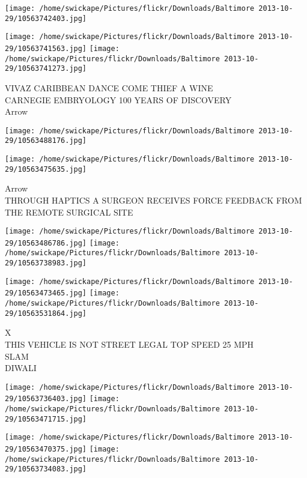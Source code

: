 \documentclass[10pt,letterpaper]{article}
\begin{document}
\texttt{[image: /home/swickape/Pictures/flickr/Downloads/Baltimore 2013-10-29/10563742403.jpg]}

\vspace{0.25in}
\texttt{[image: /home/swickape/Pictures/flickr/Downloads/Baltimore 2013-10-29/10563741563.jpg]}
\texttt{[image: /home/swickape/Pictures/flickr/Downloads/Baltimore 2013-10-29/10563741273.jpg]}

VIVAZ CARIBBEAN DANCE COME THIEF A WINE\\
CARNEGIE EMBRYOLOGY 100 YEARS OF DISCOVERY\\
Arrow\\
\pagebreak

\texttt{[image: /home/swickape/Pictures/flickr/Downloads/Baltimore 2013-10-29/10563488176.jpg]}

\vspace{0.25in}
\texttt{[image: /home/swickape/Pictures/flickr/Downloads/Baltimore 2013-10-29/10563475635.jpg]}

Arrow\\
THROUGH HAPTICS A SURGEON RECEIVES FORCE FEEDBACK FROM THE REMOTE SURGICAL SITE\\
\pagebreak

\texttt{[image: /home/swickape/Pictures/flickr/Downloads/Baltimore 2013-10-29/10563486786.jpg]}
\texttt{[image: /home/swickape/Pictures/flickr/Downloads/Baltimore 2013-10-29/10563738983.jpg]}

\texttt{[image: /home/swickape/Pictures/flickr/Downloads/Baltimore 2013-10-29/10563473465.jpg]}
\texttt{[image: /home/swickape/Pictures/flickr/Downloads/Baltimore 2013-10-29/10563531864.jpg]}

X\\
THIS VEHICLE IS NOT STREET LEGAL TOP SPEED 25 MPH\\
SLAM\\
DIWALI\\
\pagebreak

\texttt{[image: /home/swickape/Pictures/flickr/Downloads/Baltimore 2013-10-29/10563736403.jpg]}
\texttt{[image: /home/swickape/Pictures/flickr/Downloads/Baltimore 2013-10-29/10563471715.jpg]}

\texttt{[image: /home/swickape/Pictures/flickr/Downloads/Baltimore 2013-10-29/10563470375.jpg]}
\texttt{[image: /home/swickape/Pictures/flickr/Downloads/Baltimore 2013-10-29/10563734083.jpg]}
\end{document}
